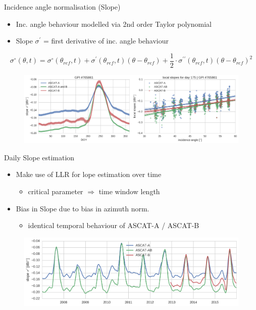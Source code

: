 \documentclass[10pt,ignorenonframetext,xcolor={dvipsnames, table}]{beamer}
\providecommand{\tightlist}{%
\setlength{\itemsep}{0pt}\setlength{\parskip}{0pt}}
\begin{document}
\begin{frame}{Incidence angle normalisation (Slope)}

\begin{itemize}
\tightlist
\item
  Inc. angle behaviour modelled via 2nd order Taylor polynomial
\item
  Slope \(\sigma^{\prime}\) = first derivative of inc. angle behaviour
\end{itemize}

\[\sigma^{\circ}\left(\theta,t\right) =
\sigma^{\circ}\left(\theta_{ref}, t\right) +
\sigma^{\prime}\left(\theta_{ref},
t\right)\left(\theta-\theta_{ref}\right) +
\frac{1}{2}\cdot\sigma^{\prime\prime}\left(\theta_{ref},
t\right)\left(\theta-\theta_{ref}\right)^{2}\]

\begin{figure}
\includegraphics[width=.8\textwidth]{./figures/slope_difference_GPI765861.png}
\end{figure}

\end{frame}

\begin{frame}{Daily Slope estimation}

\begin{itemize}
\tightlist
\item
  Make use of LLR for lope estimation over time

  \begin{itemize}
  \tightlist
  \item
    critical parameter \(\Rightarrow\) time window length
  \end{itemize}
\item
  Bias in Slope due to bias in azimuth norm.

  \begin{itemize}
  \tightlist
  \item
    identical temporal behaviour of ASCAT-A / ASCAT-B
  \end{itemize}
\end{itemize}

\begin{figure}
\includegraphics[width=.75\textwidth]{./figures/daily_slope_estimates_GPI765861.png}
\end{figure}

\end{frame}
\end{document}

